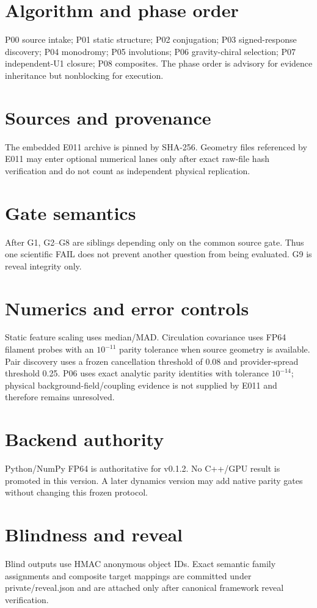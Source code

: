 \documentclass[11pt]{article}
\begin{document}
\section{Algorithm and phase order}
P00 source intake; P01 static structure; P02 conjugation; P03 signed-response discovery; P04 monodromy; P05 involutions; P06 gravity-chiral selection; P07 independent-U1 closure; P08 composites. The phase order is advisory for evidence inheritance but nonblocking for execution.
\section{Sources and provenance}
The embedded E011 archive is pinned by SHA-256. Geometry files referenced by E011 may enter optional numerical lanes only after exact raw-file hash verification and do not count as independent physical replication.
\section{Gate semantics}
After G1, G2--G8 are siblings depending only on the common source gate. Thus one scientific FAIL does not prevent another question from being evaluated. G9 is reveal integrity only.
\section{Numerics and error controls}
Static feature scaling uses median/MAD. Circulation covariance uses FP64 filament probes with an $10^{-11}$ parity tolerance when source geometry is available. Pair discovery uses a frozen cancellation threshold of 0.08 and provider-spread threshold 0.25. P06 uses exact analytic parity identities with tolerance $10^{-14}$; physical background-field/coupling evidence is not supplied by E011 and therefore remains unresolved.
\section{Backend authority}
Python/NumPy FP64 is authoritative for v0.1.2. No C++/GPU result is promoted in this version. A later dynamics version may add native parity gates without changing this frozen protocol.
\section{Blindness and reveal}
Blind outputs use HMAC anonymous object IDs. Exact semantic family assignments and composite target mappings are committed under private/reveal.json and are attached only after canonical framework reveal verification.
\end{document}
